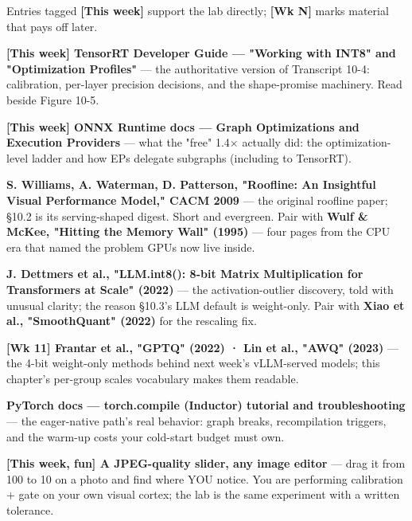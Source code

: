 
Entries tagged \textbf{[This week]} support the lab directly; \textbf{[Wk N]} marks material that pays off later.

\begin{tbbitemize}
  \item \textbf{[This week] TensorRT Developer Guide — "Working with INT8" and "Optimization Profiles"} — the authoritative version of Transcript 10-4: calibration, per-layer precision decisions, and the shape-promise machinery. Read beside Figure 10-5.
  \item \textbf{[This week] ONNX Runtime docs — Graph Optimizations and Execution Providers} — what the "free" 1.4× actually did: the optimization-level ladder and how EPs delegate subgraphs (including to TensorRT).
  \item \textbf{S. Williams, A. Waterman, D. Patterson, "Roofline: An Insightful Visual Performance Model," CACM 2009} — the original roofline paper; §10.2 is its serving-shaped digest. Short and evergreen. Pair with \textbf{Wulf \& McKee, "Hitting the Memory Wall" (1995)} — four pages from the CPU era that named the problem GPUs now live inside.
  \item \textbf{J. Dettmers et al., "LLM.int8(): 8-bit Matrix Multiplication for Transformers at Scale" (2022)} — the activation-outlier discovery, told with unusual clarity; the reason §10.3's LLM default is weight-only. Pair with \textbf{Xiao et al., "SmoothQuant" (2022)} for the rescaling fix.
  \item \textbf{[Wk 11] Frantar et al., "GPTQ" (2022) · Lin et al., "AWQ" (2023)} — the 4-bit weight-only methods behind next week's vLLM-served models; this chapter's per-group scales vocabulary makes them readable.
  \item \textbf{PyTorch docs — torch.compile (Inductor) tutorial and troubleshooting} — the eager-native path's real behavior: graph breaks, recompilation triggers, and the warm-up costs your cold-start budget must own.
  \item \textbf{[This week, fun] A JPEG-quality slider, any image editor} — drag it from 100 to 10 on a photo and find where YOU notice. You are performing calibration + gate on your own visual cortex; the lab is the same experiment with a written tolerance.
\end{tbbitemize}

\vspace{5.0pt}

